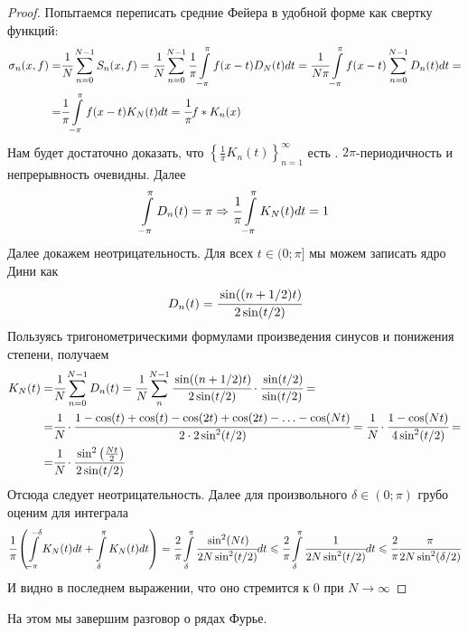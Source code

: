 	\begin{proof}
		Попытаемся переписать средние Фейера в удобной форме как свертку функций:
		\begin{align*}
			\sigma_n(x,f) =& \cfrac{1}{N}\sum\limits_{n=0}^{N-1}S_n(x,f) = \cfrac{1}{N}\sum\limits_{n=0}^{N-1}\cfrac{1}{\pi}\int\limits_{-\pi}^{\pi}f(x-t)D_N(t)dt = \cfrac{1}{N\pi}\int\limits_{-\pi}^{\pi}f(x-t)\sum\limits_{n=0}^{N-1}D_n(t)dt = \\ =& \cfrac{1}{\pi}\int\limits_{-\pi}^{\pi}f(x-t)K_N(t)dt = \cfrac{1}{\pi}f*K_n(x)
		\end{align*}
		Нам будет достаточно доказать, что $\left\{\frac{1}{\pi}K_n(t)\right\}_{n=1}^{\infty}$ есть \lmao. 
		$2\pi$-периодичность и непрерывность очевидны. Далее
		$$
			\int\limits_{-\pi}^{\pi}D_n(t) = \pi \Rightarrow \cfrac{1}{\pi} \int\limits_{-\pi}^{\pi}K_N(t) dt = 1
		$$
		Далее докажем неотрицательность. Для всех $t \in (0; \pi]$ мы можем записать ядро Дини как
		$$
			D_n(t) = \cfrac{\sin((n + 1/2)t)}{2\sin(t/2)}
		$$
		Пользуясь тригонометрическими формулами произведения синусов и понижения степени, получаем
		\begin{align}
			K_N(t) =& \cfrac{1}{N}\sum\limits_{n=0}^{N-1} D_n(t) = \cfrac{1}{N}\sum\limits_{n}^{N-1} \cfrac{\sin((n + 1/2)t)}{2\sin(t/2)}\cdot\cfrac{\sin(t/2)}{\sin(t/2)} = \\
			=& \cfrac{1}{N}\cdot \cfrac{1 - \cos(t) + \cos(t) - \cos(2t) + \cos(2t) - \ldots - \cos(Nt)}{2\cdot 2\sin^2(t/2)} = \cfrac{1}{N}\cdot \cfrac{1 - \cos(Nt)}{4\sin^2(t/2)} =\\
			=&\cfrac{1}{N}\cdot \cfrac{\sin^2\left(\frac{Nt}{2}\right)}{2\sin(t/2)}
	    \end{align}
	    Отсюда следует неотрицательность.
	    Далее для произвольного $\delta \in (0;\pi)$ грубо оценим для интеграла
	    \begin{gather}
	    	\cfrac{1}{\pi}\left(\int\limits_{-\pi}^{-\delta}K_N(t)dt + \int\limits_{\delta}^{\pi}K_N(t)dt\right) = \cfrac{2}{\pi}\int\limits_{\delta}^{\pi}\cfrac{\sin^2(Nt)}{2N\sin^2(t/2)}dt \leqslant \cfrac{2}{\pi}\int\limits_{\delta}^{\pi} \cfrac{1}{2N\sin^2(t/2)}dt \leqslant \cfrac{2}{\pi}\cfrac{\pi}{2N \sin^2(\delta/2)}
	    \end{gather}
	    И видно в последнем выражении, что оно стремится к 0 при $N \to \infty$
	\end{proof}
	На этом мы завершим разговор о рядах Фурье.
